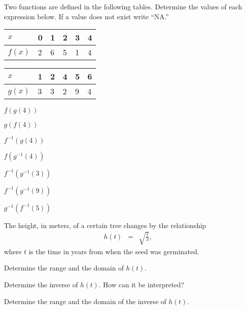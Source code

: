 \begin{problem}
\item Two functions are defined in the following tables. Determine the
  values of each expression below. If a value does not exist write
  ``NA.''

  \begin{tabular}[h]{l||l|l|l|l|l}
    $x$    & 0 & 1 & 2 & 3 & 4 \\ \hline
    $f(x)$ & 2 & 6 & 5 & 1 & 4 \\
  \end{tabular}

  \begin{tabular}[h]{l||l|l|l|l|l}
    $x$    & 1 & 2 & 4 & 5 & 6 \\ \hline
    $g(x)$ & 3 & 3 & 2 & 9 & 4 \\
  \end{tabular}

  \begin{subproblem}
  \item $f(g(4))$
    \vfill
  \item $g(f(4))$
    \vfill
  \item $f^{-1}(g(4))$
    \vfill
  \item $f(g^{-1}(4))$
    \vfill
  \item $f^{-1}(g^{-1}(3))$
    \vfill
  \item $f^{-1}(g^{-1}(9))$
    \vfill
  \item $g^{-1}(f^{-1}(5))$
    \vfill
  \end{subproblem}

  \clearpage

\item The height, in meters, of a certain tree changes by the
  relationship
  \begin{eqnarray*}
    h(t) & = & \sqrt{\frac{t}{3}},
  \end{eqnarray*}
  where $t$ is the time in years from when the seed was germinated.
  \begin{subproblem}
    \item Determine the range and the domain of $h(t)$.
      \vfill
    \item Determine the inverse of $h(t)$. How can it be interpreted?
      \vfill
    \item Determine the range and the domain of the inverse of $h(t)$.
      \vfill
  \end{subproblem}

  \clearpage


\end{problem}
